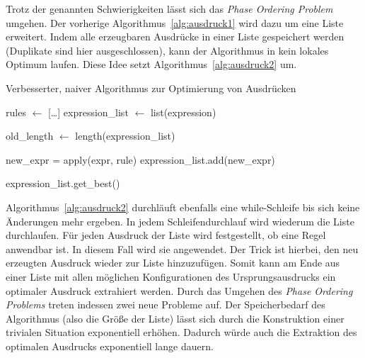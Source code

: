 \noindent Trotz der genannten Schwierigkeiten lässt sich das \textit{Phase Ordering Problem} umgehen. Der vorherige Algorithmus~\ref{alg:ausdruck1} wird dazu um eine Liste erweitert.
Indem alle erzeugbaren Ausdrücke in einer Liste gespeichert werden (Duplikate sind hier ausgeschlossen), kann der Algorithmus in kein lokales Optimum laufen.
Diese Idee setzt Algorithmus~\ref{alg:ausdruck2} um.



\begin{algorithm}[H]
  \caption{Verbesserter, naiver Algorithmus zur Optimierung von Ausdrücken}\label{alg:ausdruck2}
  \begin{algorithmic}
    \State rules $\gets$ [\ldots]
    \State expression\_list $\gets$ list(expression)
    
      \State old\_length $\gets$ length(expression\_list)

          \State new\_expr = apply(expr, rule)
          \State expression\_list.add(new\_expr)
          \EndIf
        \EndFor
      \EndFor
    \EndWhile

    \State \Return expression\_list.get\_best()
    \EndFunction
  \end{algorithmic}
\end{algorithm}

Algorithmus~\ref{alg:ausdruck2} durchläuft ebenfalls eine while-Schleife bis sich keine Änderungen mehr ergeben. In jedem Schleifendurchlauf wird wiederum die Liste durchlaufen.
Für jeden Ausdruck der Liste wird festgestellt, ob eine Regel anwendbar ist. In diesem Fall wird sie angewendet. Der Trick ist hierbei, den neu erzeugten Ausdruck wieder zur Liste 
hinzuzufügen. Somit kann am Ende aus einer Liste mit allen möglichen Konfigurationen des Ursprungsausdrucks ein optimaler Ausdruck extrahiert werden.
Durch das Umgehen des \textit{Phase Ordering Problems} treten indessen zwei neue Probleme auf.
Der Speicherbedarf des Algorithmus (also die Größe der Liste) lässt sich durch die Konstruktion einer trivialen Situation exponentiell erhöhen.
Dadurch würde auch die Extraktion des optimalen Ausdrucks exponentiell lange dauern.


